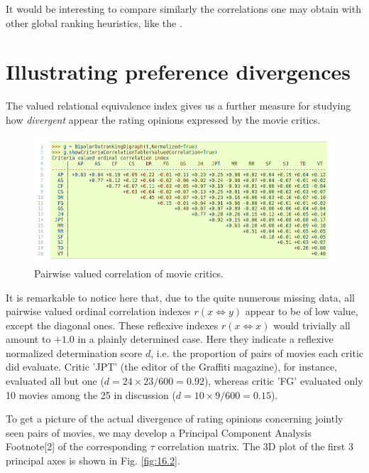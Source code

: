It would be interesting to compare similarly the correlations one may obtain with other global ranking heuristics, like the \Copeland.

\section{Illustrating preference divergences}
\label{sec:16.4}

The valued relational equivalence index gives us a further measure for studying how \emph{divergent} appear the rating opinions expressed by the movie critics.
\begin{figure}[h]
\sidecaption
\includegraphics[width=12cm]{Figures/correlationTable.png}
\caption{Pairwise valued correlation of movie critics.} 
\label{fig:16.6}       %
\end{figure}

It is remarkable to notice here that, due to the quite numerous missing data, all pairwise valued ordinal correlation indexes $r(x\Leftrightarrow y)$ appear to be of low value, except the diagonal ones. These reflexive indexes $r(x\Leftrightarrow x)$ would trivially all amount to $+1.0$ in a plainly determined case. Here they indicate a reflexive normalized determination score $d$, i.e. the proportion of pairs of movies each critic did evaluate. Critic 'JPT' (the editor of the Graffiti magazine), for instance, evaluated all but one ($d = 24\times23/600 = 0.92$), whereas critic 'FG' evaluated only 10 movies among the 25 in discussion ($d = 10\times9/600 = 0.15$).

To get a picture of the actual divergence of rating opinions concerning jointly seen pairs of movies, we may develop a Principal Component Analysis Footnote[2] of the corresponding $\tau$ correlation matrix. The 3D plot of the first 3 principal axes is shown in Fig. \ref{fig:16.2}.

